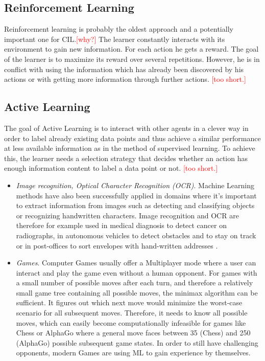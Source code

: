 \documentclass[conference]{IEEEtran}
\newcommand\notes[1]{\textcolor{red}{#1}}
\begin{document}
\subsection{Reinforcement Learning}\label{reinforcement}
Reinforcement learning is probably the oldest approach and a potentially important one for CIL\@.\notes{[why?]} 
The learner constantly interacts with its environment to gain new information. For each action 
he gets a reward. The goal of the learner is to maximize its reward over several repetitions. 
However, he is in conflict with using the information which has already been discovered by his actions 
or with getting more information through further actions.
\notes{[too short.]}

\subsection{Active Learning}\label{active}
The goal of Active Learning is to interact with other agents in a clever way in order 
to label already existing data points and thus achieve a similar performance at less available 
information as in the method of supervised learning. To achieve this, 
the learner needs a selection strategy\cite{ActiveToDedicated:calma} that decides whether 
an action has enough information content to label a data point or not.
\notes{[too short.]}

\begin{itemize}
    \item \textit{Image recognition, Optical Character Recognition (OCR)}.
        Machine Learning methods have also been successfully applied in domains where it's 
        important to extract information from images such as detecting and classifying 
        objects or recognizing handwritten characters. Image 
        recognition and OCR are therefore for example used in medical diagnosis to 
        detect cancer on radiographs, in autonomous vehicles to detect obstacles and to 
        stay on track or in post-offices to sort envelopes with hand-written addresses
        \cite{DisciplineOfML:mitchell}.
    \item \textit{Games}.
        Computer Games usually offer a Multiplayer mode where a user can interact and 
        play the game even without a human opponent. For games with a small number of 
        possible moves after each turn, and therefore a relatively small game tree containing 
        all possible moves, the minimax algorithm\cite{Prog2:bachmaier} can be sufficient. 
        It figures out which next move would minimize the worst-case scenario for all subsequent 
        moves. Therefore, it needs to know all possible moves, which can easily become computationally 
        infeasible for games like Chess or AlphaGo where a general move faces between 35 (Chess) and 
        250 (AlphaGo) possible subsequent game states.
        In order to still have challenging opponents, modern Games are using ML to gain experience 
        by themselves.
\end{itemize}
\end{document}
